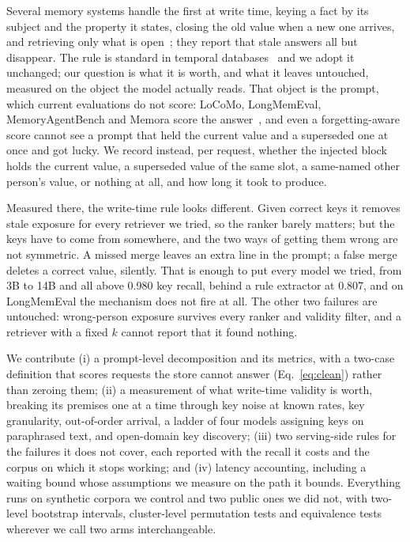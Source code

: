 \documentclass{article} %
\begin{document}
Several memory systems handle the first at write time, keying a fact by its subject and the property it states, closing the old value when a new one arrives, and retrieving only what is open~\citep{rasmussen2025zep,chhikara2025mem0,yadav2026memstrata,wang2026toki}; they report that stale answers all but disappear. The rule is standard in temporal databases~\citep{jensen1999temporal} and we adopt it unchanged; our question is what it is worth, and what it leaves untouched, measured on the object the model actually reads. That object is the prompt, which current evaluations do not score: LoCoMo, LongMemEval, MemoryAgentBench and Memora score the answer~\citep{maharana2024evaluating,wu2024longmemeval,hu2026memoryagentbench,uddin2026memora}, and even a forgetting-aware score cannot see a prompt that held the current value and a superseded one at once and got lucky. We record instead, per request, whether the injected block holds the current value, a superseded value of the same slot, a same-named other person's value, or nothing at all, and how long it took to produce.

Measured there, the write-time rule looks different. Given correct keys it removes stale exposure for every retriever we tried, so the ranker barely matters; but the keys have to come from somewhere, and the two ways of getting them wrong are not symmetric. A missed merge leaves an extra line in the prompt; a false merge deletes a correct value, silently. That is enough to put every model we tried, from 3B to 14B and all above 0.980 key recall, behind a rule extractor at 0.807, and on LongMemEval the mechanism does not fire at all. The other two failures are untouched: wrong-person exposure survives every ranker and validity filter, and a retriever with a fixed $k$ cannot report that it found nothing.

We contribute (i) a prompt-level decomposition and its metrics, with a two-case definition that scores requests the store cannot answer (Eq.~\ref{eq:clean}) rather than zeroing them; (ii) a measurement of what write-time validity is worth, breaking its premises one at a time through key noise at known rates, key granularity, out-of-order arrival, a ladder of four models assigning keys on paraphrased text, and open-domain key discovery; (iii) two serving-side rules for the failures it does not cover, each reported with the recall it costs and the corpus on which it stops working; and (iv) latency accounting, including a waiting bound whose assumptions we measure on the path it bounds. Everything runs on synthetic corpora we control and two public ones we did not, with two-level bootstrap intervals, cluster-level permutation tests and equivalence tests wherever we call two arms interchangeable.
\end{document}
